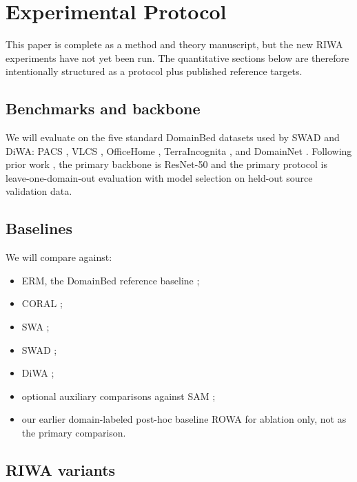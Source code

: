 \documentclass{article}
\newcommand{\riwa}{\textup{\textsc{RIWA}}}
\newcommand{\swad}{\textup{\textsc{SWAD}}}
\newcommand{\rowa}{\textup{\textsc{ROWA}}}
\begin{document}
\section{Experimental Protocol}
\label{sec:experiments}

This paper is complete as a method and theory manuscript, but the new \riwa{} experiments have not yet been run. The quantitative sections below are therefore intentionally structured as a protocol plus published reference targets.

\subsection{Benchmarks and backbone}

We will evaluate on the five standard DomainBed datasets used by \swad{} and DiWA: PACS \citep{li2017pacs}, VLCS \citep{fang2013vlcs}, OfficeHome \citep{venkateswara2017officehome}, TerraIncognita \citep{beery2018terraincognita}, and DomainNet \citep{peng2019domainnet}. Following prior work \citep{cha2021wad,rame2022diwa,gulrajani2021in}, the primary backbone is ResNet-50 and the primary protocol is leave-one-domain-out evaluation with model selection on held-out source validation data.

\subsection{Baselines}

We will compare against:
\begin{itemize}[leftmargin=1.4em]
    \item ERM, the DomainBed reference baseline \citep{gulrajani2021in};
    \item CORAL \citep{sun2016coral};
    \item SWA \citep{izmailov2018swa};
    \item \swad{} \citep{cha2021wad};
    \item DiWA \citep{rame2022diwa};
    \item optional auxiliary comparisons against SAM \citep{foret2021};
    \item our earlier domain-labeled post-hoc baseline \rowa{} for ablation only, not as the primary comparison.
\end{itemize}

\subsection{\riwa{} variants}
\end{document}
